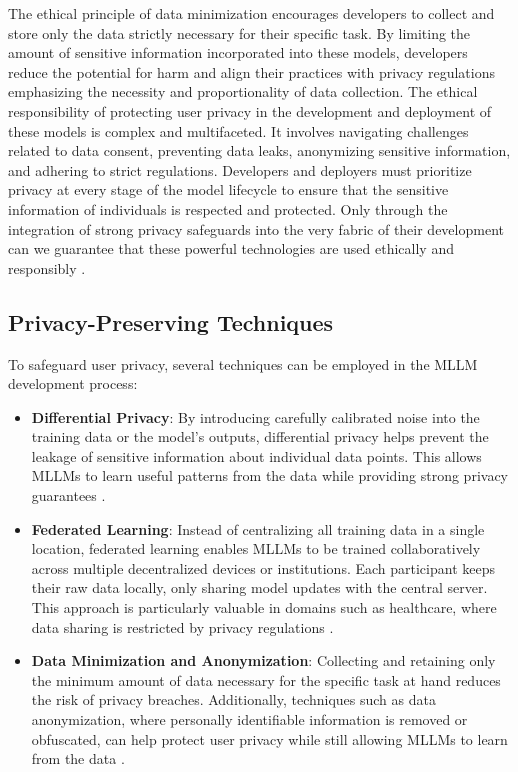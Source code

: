 The ethical principle of data minimization encourages developers to collect and store only the data strictly necessary for their specific task. By limiting the amount of sensitive information incorporated into these models, developers reduce the potential for harm and align their practices with privacy regulations emphasizing the necessity and proportionality of data collection. The ethical responsibility of protecting user privacy in the development and deployment of these models is complex and multifaceted. It involves navigating challenges related to data consent, preventing data leaks, anonymizing sensitive information, and adhering to strict regulations. Developers and deployers must prioritize privacy at every stage of the model lifecycle to ensure that the sensitive information of individuals is respected and protected. Only through the integration of strong privacy safeguards into the very fabric of their development can we guarantee that these powerful technologies are used ethically and responsibly \cite{sanderson2023ai,phattanaviroj2024data,kibriya2024privacy}.

\subsection{Privacy-Preserving Techniques}

To safeguard user privacy, several techniques can be employed in the MLLM development process:

\begin{itemize}
    \item \textbf{Differential Privacy}: By introducing carefully calibrated noise into the training data or the model's outputs, differential privacy helps prevent the leakage of sensitive information about individual data points. This allows MLLMs to learn useful patterns from the data while providing strong privacy guarantees \cite{singh2024whispered,charles2024fine}.
    
    \item \textbf{Federated Learning}: Instead of centralizing all training data in a single location, federated learning enables MLLMs to be trained collaboratively across multiple decentralized devices or institutions. Each participant keeps their raw data locally, only sharing model updates with the central server. This approach is particularly valuable in domains such as healthcare, where data sharing is restricted by privacy regulations \cite{kuang2024federatedscope}.
    
    \item \textbf{Data Minimization and Anonymization}: Collecting and retaining only the minimum amount of data necessary for the specific task at hand reduces the risk of privacy breaches. Additionally, techniques such as data anonymization, where personally identifiable information is removed or obfuscated, can help protect user privacy while still allowing MLLMs to learn from the data \cite{wiest2024anonymizing, li2024llm}.
\end{itemize}


